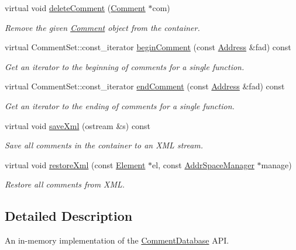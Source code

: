 \begin{DoxyCompactItemize}
virtual void \mbox{\hyperlink{class_comment_database_internal_a623dac65760a7c7a328c652f34ee714a}{delete\+Comment}} (\mbox{\hyperlink{class_comment}{Comment}} $\ast$com)
\begin{DoxyCompactList}\small\item\em Remove the given \mbox{\hyperlink{class_comment}{Comment}} object from the container. \end{DoxyCompactList}\item 
virtual Comment\+Set\+::const\+\_\+iterator \mbox{\hyperlink{class_comment_database_internal_a23097880c0ad74fdbe692772957844f6}{begin\+Comment}} (const \mbox{\hyperlink{class_address}{Address}} \&fad) const
\begin{DoxyCompactList}\small\item\em Get an iterator to the beginning of comments for a single function. \end{DoxyCompactList}\item 
virtual Comment\+Set\+::const\+\_\+iterator \mbox{\hyperlink{class_comment_database_internal_a67ef8bcfd5778dd45acfd533ffd56189}{end\+Comment}} (const \mbox{\hyperlink{class_address}{Address}} \&fad) const
\begin{DoxyCompactList}\small\item\em Get an iterator to the ending of comments for a single function. \end{DoxyCompactList}\item 
virtual void \mbox{\hyperlink{class_comment_database_internal_ace5b454d66acbc275e8cf20defc0e242}{save\+Xml}} (ostream \&s) const
\begin{DoxyCompactList}\small\item\em Save all comments in the container to an X\+ML stream. \end{DoxyCompactList}\item 
virtual void \mbox{\hyperlink{class_comment_database_internal_a461a9fbe7e898e251637bd605d5758e2}{restore\+Xml}} (const \mbox{\hyperlink{class_element}{Element}} $\ast$el, const \mbox{\hyperlink{class_addr_space_manager}{Addr\+Space\+Manager}} $\ast$manage)
\begin{DoxyCompactList}\small\item\em Restore all comments from X\+ML. \end{DoxyCompactList}\end{DoxyCompactItemize}


\subsection{Detailed Description}
An in-\/memory implementation of the \mbox{\hyperlink{class_comment_database}{Comment\+Database}} A\+PI. 

